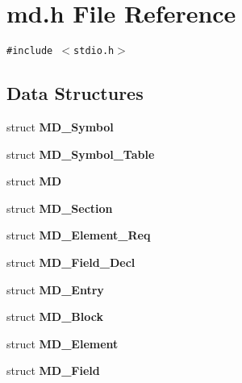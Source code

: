 \section{md.h File Reference}
\label{md_8h}
{\tt \#include $<$stdio.h$>$}\par
\subsection*{Data Structures}
\begin{CompactItemize}
\item 
struct \bf{MD\_\-Symbol}
\item 
struct \bf{MD\_\-Symbol\_\-Table}
\item 
struct \bf{MD}
\item 
struct \bf{MD\_\-Section}
\item 
struct \bf{MD\_\-Element\_\-Req}
\item 
struct \bf{MD\_\-Field\_\-Decl}
\item 
struct \bf{MD\_\-Entry}
\item 
struct \bf{MD\_\-Block}
\item 
struct \bf{MD\_\-Element}
\item 
struct \bf{MD\_\-Field}
\end{CompactItemize}
